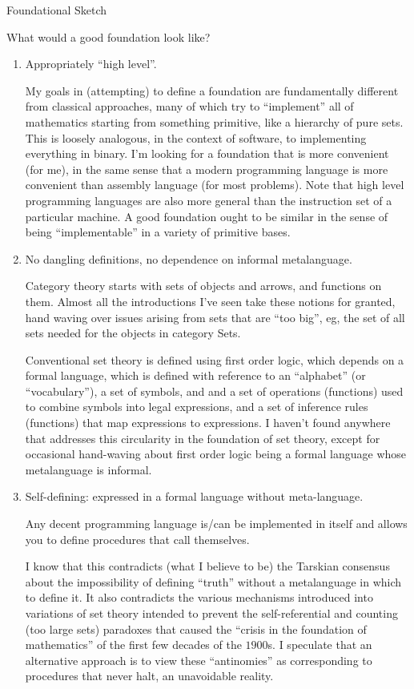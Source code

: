 \begin{plSection}{Foundational Sketch}
\begin{plSection}{What would a good foundation look like?}
\begin{enumerate}
  \item Appropriately ``high level''. \par
  My goals in (attempting) to define a foundation are fundamentally
different from classical approaches,
many of which try to ``implement'' all of mathematics starting from
something primitive, like a hierarchy of pure sets.
This is loosely analogous, in the context of software,
to implementing everything in binary.
I'm looking for a foundation that is more convenient (for me),
in the same sense that a modern programming language is more
convenient than assembly language (for most problems).
Note that high level programming languages are also more general
than the instruction set of a particular machine.
A good foundation ought to be similar in the sense of being
``implementable'' in a variety of primitive bases.

  \item No dangling definitions, no dependence on informal metalanguage.
   \par
  Category theory starts with sets of objects and arrows, 
  and functions on them. Almost all the introductions I've seen 
  take these notions for granted, hand waving over issues arising
  from sets that are ``too big'', eg, the set of all sets needed
  for the objects in category Sets.
  \par
  Conventional set theory is defined using first order logic,
  which depends on a formal language, which is defined with
  reference to an ``alphabet'' (or ``vocabulary''), 
  a set of symbols, and and a set of
  operations (functions) used to combine symbols into legal 
  expressions, and a set of inference rules (functions) that map
  expressions to expressions. I haven't found anywhere that
  addresses this circularity in the foundation of set theory,
  except for occasional hand-waving about first order logic
  being a formal language whose metalanguage is informal.
  
  \item Self-defining: expressed in a formal language
  without meta-language. \par
  Any decent programming language
  is/can be implemented in itself and allows you to define 
  procedures that call themselves. \par
  I know that this
  contradicts (what I believe to be) the Tarskian consensus about
  the impossibility of defining ``truth'' without a metalanguage
  in which to define it. It also contradicts the various 
  mechanisms introduced into variations of set theory intended to
  prevent the self-referential and counting (too large sets) 
  paradoxes that caused the 
  ``crisis in the foundation of mathematics'' of the first few
  decades of the $1900$s.
  I speculate that an alternative approach is to view these
  ``antinomies'' as corresponding to procedures that never halt,
  an unavoidable reality.
  

\end{enumerate}
\end{plSection}
\end{plSection}
